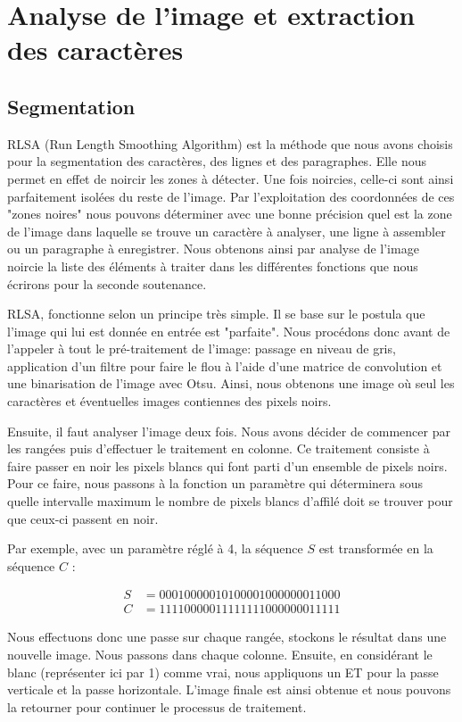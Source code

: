 \documentclass[11pt]{report}
\begin{document}
\chapter{Analyse de l'image et extraction des caractères}

\section{Segmentation}

RLSA (Run Length Smoothing Algorithm) est la méthode que nous avons choisis pour la segmentation des caractères, des lignes et des paragraphes. Elle nous permet en effet de noircir les zones à détecter. Une fois noircies, celle-ci sont ainsi parfaitement isolées du reste de l'image. Par l'exploitation des coordonnées de ces "zones noires" nous pouvons déterminer avec une bonne précision quel est la zone de l'image dans laquelle se trouve un caractère à analyser, une ligne à assembler ou un paragraphe à enregistrer. Nous obtenons ainsi par analyse de l'image noircie la liste des éléments à traiter dans les différentes fonctions que nous écrirons pour la seconde soutenance.

RLSA, fonctionne selon un principe très simple. Il se base sur le postula que l'image qui lui est donnée en entrée est "parfaite". Nous procédons donc avant de l'appeler à tout le pré-traitement de l'image: passage en niveau de gris, application d'un filtre pour faire le flou à l'aide d'une matrice de convolution et une binarisation de l'image avec Otsu. Ainsi, nous obtenons une image où seul les caractères et éventuelles images contiennes des pixels noirs.

Ensuite, il faut analyser l'image deux fois. Nous avons décider de commencer par les rangées puis d'effectuer le traitement en colonne. Ce traitement consiste à faire passer en noir les pixels blancs qui font parti d'un ensemble de pixels noirs. Pour ce faire, nous passons à la fonction un paramètre qui déterminera sous quelle intervalle maximum le nombre de pixels blancs d'affilé doit se trouver pour que ceux-ci passent en noir.

Par exemple, avec un paramètre réglé à 4, la séquence $S$ est transformée en la séquence $C$ :

\begin{align*}
S &= 00010000010100001000000011000\\
C &= 11110000011111111000000011111
\end{align*}

Nous effectuons donc une passe sur chaque rangée, stockons le résultat dans une nouvelle image. Nous passons dans chaque colonne. Ensuite, en considérant le blanc (représenter ici par 1) comme vrai, nous appliquons un ET pour la passe verticale et la passe horizontale. L'image finale est ainsi obtenue et nous pouvons la retourner pour continuer le processus de traitement.
\end{document}
